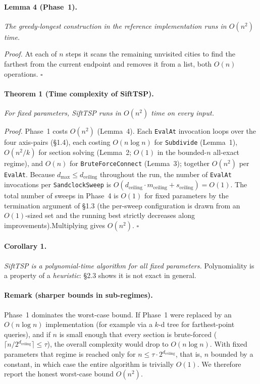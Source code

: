 \documentclass[11pt,a4paper]{article}
\begin{document}
\paragraph{Lemma 4 (Phase~1).} \textit{The greedy-longest construction
in the reference implementation runs in $O(n^2)$ time.}

\textit{Proof.} At each of $n$ steps it scans the remaining unvisited
cities to find the farthest from the current endpoint and removes it
from a list, both $O(n)$ operations. $\square$

\paragraph{Theorem 1 (Time complexity of SiftTSP).} \textit{For fixed
parameters, SiftTSP runs in $O(n^2)$ time on every input.}

\textit{Proof.} Phase~1 costs $O(n^2)$ (Lemma~4). Each \texttt{EvalAt}
invocation loops over the four axis-pairs (\S1.4), each costing
$O(n \log n)$ for \texttt{Subdivide} (Lemma~1), $O(n^2/k)$ for section
solving (Lemma~2; $O(1)$ in the bounded-$n$ all-exact regime), and
$O(n)$ for \texttt{BruteForceConnect} (Lemma~3); together $O(n^2)$ per
\texttt{EvalAt}. Because $d_{\max} \leq d_{\text{ceiling}}$ throughout
the run, the number of \texttt{EvalAt} invocations per
\texttt{SandclockSweep} is
$O(d_{\text{ceiling}} \cdot m_{\text{ceiling}} + s_{\text{ceiling}}) = O(1)$.
The total number of sweeps in Phase~4 is $O(1)$ for fixed parameters
by the termination argument of \S1.3 (the per-sweep configuration is
drawn from an $O(1)$-sized set and the running best strictly
decreases along improvements).Multiplying gives $O(n^2)$.
$\square$

\paragraph{Corollary 1.} \textit{SiftTSP is a polynomial-time algorithm
for all fixed parameters.} Polynomiality is a property of a
\emph{heuristic}: \S2.3 shows it is not exact in general.

\paragraph{Remark (sharper bounds in sub-regimes).} Phase~1 dominates
the worst-case bound. If Phase~1 were replaced by an $O(n \log n)$
implementation (for example via a $k$-d tree for farthest-point
queries), and if $n$ is small enough that every section is brute-forced
($\lceil n / 2^{d_{\text{ceiling}}} \rceil \leq \tau$), the overall
complexity would drop to $O(n \log n)$. With fixed parameters that
regime is reached only for $n \leq \tau \cdot 2^{d_{\text{ceiling}}}$,
that is, $n$ bounded by a constant, in which case the entire algorithm
is trivially $O(1)$. We therefore report the honest worst-case bound
$O(n^2)$.
\end{document}
